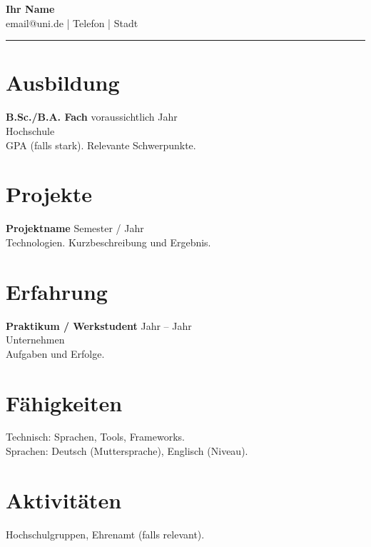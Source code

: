 \documentclass[11pt,a4paper]{article}
\begin{document}
\begin{center}
{\LARGE \textbf{Ihr Name}}\\[0.2em]
email@uni.de \quad | \quad Telefon \quad | \quad Stadt
\end{center}
\begin{flushright}\rule{2cm}{2.5cm}\end{flushright}
\vspace{0.4em}
\section*{Ausbildung}
\textbf{B.Sc./B.A. Fach} \hfill voraussichtlich Jahr \\
Hochschule \\
GPA (falls stark). Relevante Schwerpunkte.
\section*{Projekte}
\textbf{Projektname} \hfill Semester / Jahr \\
Technologien. Kurzbeschreibung und Ergebnis.
\section*{Erfahrung}
\textbf{Praktikum / Werkstudent} \hfill Jahr -- Jahr \\
Unternehmen \\
Aufgaben und Erfolge.
\section*{Fähigkeiten}
Technisch: Sprachen, Tools, Frameworks. \\
Sprachen: Deutsch (Muttersprache), Englisch (Niveau).
\section*{Aktivitäten}
Hochschulgruppen, Ehrenamt (falls relevant).
\end{document}
